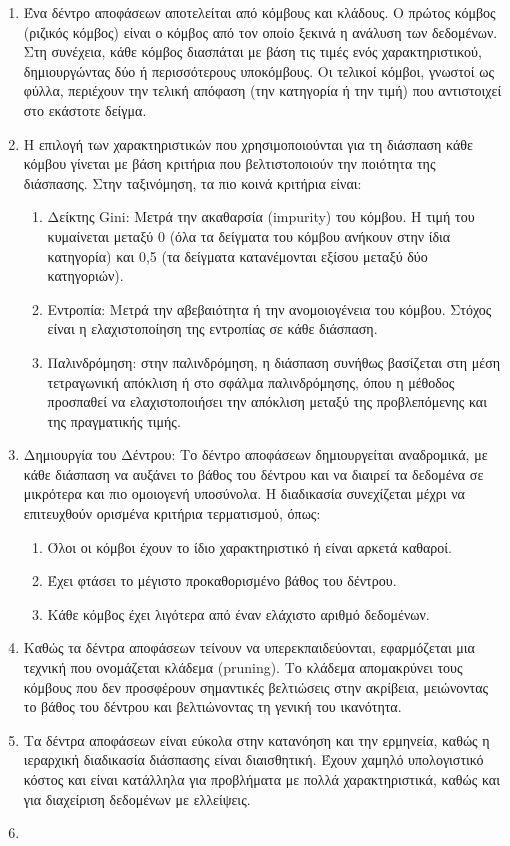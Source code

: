 \documentclass[diploma]{softlab-thesis}
\begin{document}
\begin{enumerate}
\item Ένα δέντρο αποφάσεων αποτελείται από κόμβους και κλάδους. Ο πρώτος κόμβος (ριζικός κόμβος) είναι ο κόμβος από τον οποίο ξεκινά η ανάλυση των δεδομένων. Στη συνέχεια, κάθε κόμβος διασπάται με βάση τις τιμές ενός χαρακτηριστικού, δημιουργώντας δύο ή περισσότερους υποκόμβους. Οι τελικοί κόμβοι, γνωστοί ως φύλλα, περιέχουν την τελική απόφαση (την κατηγορία ή την τιμή) που αντιστοιχεί στο εκάστοτε δείγμα.
\item Η επιλογή των χαρακτηριστικών που χρησιμοποιούνται για τη διάσπαση κάθε κόμβου γίνεται με βάση κριτήρια που βελτιστοποιούν την ποιότητα της διάσπασης. Στην ταξινόμηση, τα πιο κοινά κριτήρια είναι:
\begin{enumerate}
\item{Δείκτης Gini}: Μετρά την ακαθαρσία (impurity) του κόμβου. Η τιμή του κυμαίνεται μεταξύ 0 (όλα τα δείγματα του κόμβου ανήκουν στην ίδια κατηγορία) και 0,5 (τα δείγματα κατανέμονται εξίσου μεταξύ δύο κατηγοριών).
\item{Εντροπία}: Μετρά την αβεβαιότητα ή την ανομοιογένεια του κόμβου. Στόχος είναι η ελαχιστοποίηση της εντροπίας σε κάθε διάσπαση.
\item{Παλινδρόμηση}: στην παλινδρόμηση, η διάσπαση συνήθως βασίζεται στη μέση τετραγωνική απόκλιση ή στο σφάλμα παλινδρόμησης, όπου η μέθοδος προσπαθεί να ελαχιστοποιήσει την απόκλιση μεταξύ της προβλεπόμενης και της πραγματικής τιμής.
\end{enumerate}
\item Δημιουργία του Δέντρου: Το δέντρο αποφάσεων δημιουργείται αναδρομικά, με κάθε διάσπαση να αυξάνει το βάθος του δέντρου και να διαιρεί τα δεδομένα σε μικρότερα και πιο ομοιογενή υποσύνολα. Η διαδικασία συνεχίζεται μέχρι να επιτευχθούν ορισμένα κριτήρια τερματισμού, όπως:
\begin{enumerate}
\item Όλοι οι κόμβοι έχουν το ίδιο χαρακτηριστικό ή είναι αρκετά καθαροί.
\item Έχει φτάσει το μέγιστο προκαθορισμένο βάθος του δέντρου.
\item Κάθε κόμβος έχει λιγότερα από έναν ελάχιστο αριθμό δεδομένων.
\end{enumerate}
\item Καθώς τα δέντρα αποφάσεων τείνουν να υπερεκπαιδεύονται, εφαρμόζεται μια τεχνική που ονομάζεται κλάδεμα (pruning). Το κλάδεμα απομακρύνει τους κόμβους που δεν προσφέρουν σημαντικές βελτιώσεις στην ακρίβεια, μειώνοντας το βάθος του δέντρου και βελτιώνοντας τη γενική του ικανότητα.
\item Τα δέντρα αποφάσεων είναι εύκολα στην κατανόηση και την ερμηνεία, καθώς η ιεραρχική διαδικασία διάσπασης είναι διαισθητική. Έχουν χαμηλό υπολογιστικό κόστος και είναι κατάλληλα για προβλήματα με πολλά χαρακτηριστικά, καθώς και για διαχείριση δεδομένων με ελλείψεις.
\item 


\end{enumerate}
\end{document}
